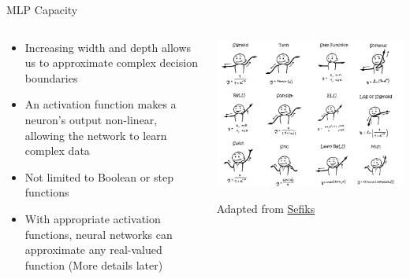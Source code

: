 \documentclass[serif, aspectratio=169]{beamer}
\begin{document}
\begin{frame}{MLP Capacity}
    \begin{columns}
        \begin{column}{0.6\textwidth}
            \begin{itemize}
                \item Increasing width and depth allows us to approximate complex decision boundaries
                \item An activation function makes a neuron’s output non-linear, allowing the network to learn complex data
                \item Not limited to Boolean or step functions
                \item With appropriate activation functions, neural networks can approximate any real-valued function (More details later)
            \end{itemize}
        \end{column}
        \begin{column}{0.4\textwidth}
            \includegraphics[width=\textwidth]{pic/2/activations.png} \\
            \begin{center}
            {\scriptsize Adapted from \href{https://sefiks.com/2020/02/02/dance-moves-of-deep-learning-activation-functions/}{Sefiks}}
            \end{center}
        \end{column}
    \end{columns}
\end{frame}
\end{document}

